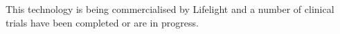 \documentclass[11pt, parskip=half*,twoside=false]{scrbook}
\begin{document}
This technology is being commercialised by Lifelight \citep{suzanneLifelightXimLimited} and a number of clinical trials have been completed or are in progress. 


%
%
%
%
%
%
%
\end{document}
